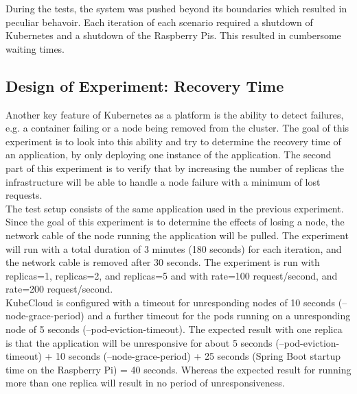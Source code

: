 \noindent
During the tests, the system was pushed beyond its boundaries which resulted in peculiar behavoir. Each iteration of each scenario required a shutdown of Kubernetes and a shutdown of the Raspberry Pis. This resulted in cumbersome waiting times.

\subsection*{Design of Experiment: Recovery Time}
Another key feature of Kubernetes as a platform is the ability to detect failures, e.g. a container failing or a node being removed from the cluster. The goal of this experiment is to look into this ability and try to determine the recovery time of an application, by only deploying one instance of the application. The second part of this experiment is to verify that by increasing the number of replicas the infrastructure will be able to handle a node failure with a minimum of lost requests. \\ 

\noindent The test setup consists of the same application used in the previous experiment. Since the goal of this experiment is to determine the effects of losing a node, the network cable of the node running the application will be pulled. The experiment will run with a total duration of 3 minutes (180 seconds) for each iteration, and the network cable is removed after 30 seconds. The experiment is run with replicas=1, replicas=2, and replicas=5 and with rate=100 request/second, and rate=200 request/second.\\

\noindent 
KubeCloud is configured with a timeout for unresponding nodes of 10 seconds (--node-grace-period) and a further timeout for the pods running on a unresponding node of 5 seconds (--pod-eviction-timeout). The expected result with one replica is that the application will be unresponsive for about 5 seconds (--pod-eviction-timeout) + 10 seconds (--node-grace-period) + 25 seconds (Spring Boot startup time on the Raspberry Pi) = 40 seconds. Whereas the expected result for running more than one replica will result in no period of unresponsiveness. \\


